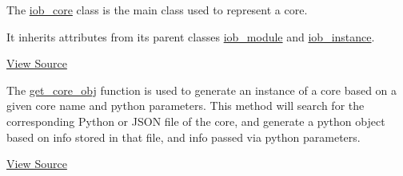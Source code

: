 %

The \href{https://github.com/IObundle/py2hwsw/blob/main/py2hwsw/scripts/iob_core.py}{iob\_core} class is the main class used to represent a core.

It inherits attributes from its parent classes \href{https://github.com/IObundle/py2hwsw/blob/main/py2hwsw/scripts/iob_module.py}{iob\_module} and \href{https://github.com/IObundle/py2hwsw/blob/main/py2hwsw/scripts/iob_instance.py}{iob\_instance}.


\href{https://github.com/IObundle/py2hwsw/blob/main/py2hwsw/scripts/iob_core.py}{View Source}

The \href{https://github.com/IObundle/py2hwsw/blob/main/py2hwsw/scripts/iob_core.py#L622}{get\_core\_obj} function is used to generate an instance of a core based on a given core name and python parameters.
This method will search for the corresponding Python or JSON file of the core, and generate a python object based on info stored in that file, and info passed via python parameters.


\href{https://github.com/IObundle/py2hwsw/blob/main/py2hwsw/scripts/iob_core.py}{View Source}
